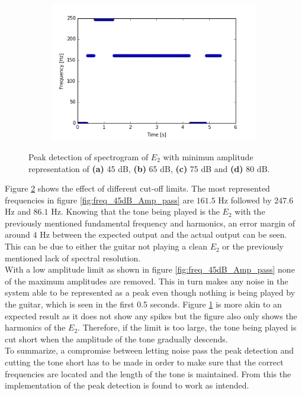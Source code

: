 \begin{figure}[H]
\begin{subfigure}{0.49\textwidth}
\includegraphics[width=\textwidth]{figures/peak_detection/peak_lim4.png}
\caption{}
\label{fig:freq_80dB_Amp_pass}

\end{subfigure}
\caption{Peak detection of spectrogram of $E_2$ with minimun amplitude representation of \textbf{(a)} 45 dB, \textbf{(b)} 65 dB, \textbf{(c)} 75 dB and \textbf{(d)} 80 dB.}
\label{fig:valdation_peak_detection}
\end{figure}
Figure \ref{fig:valdation_peak_detection} shows the effect of different cut-off limits. The most represented frequencies in figure \ref{fig:freq_45dB_Amp_pass} are $161.5$ Hz followed by $247.6$ Hz and $86.1$ Hz. 
Knowing that the tone being played is the $E_2$ with the previously mentioned fundamental frequency and harmonics, an error margin of around $4$ Hz between the expected output and the actual output can be seen. This can be due to either the guitar not playing a clean $E_2$ or the previously mentioned lack of spectral resolution.
\\
With a low amplitude limit as shown in figure \ref{fig:freq_45dB_Amp_pass} none of the maximum amplitudes are removed. This in turn makes any noise in the system able to be represented as a peak even though nothing is being played by the guitar, which is seen in the first 0.5 seconds.
Figure \ref{fig:freq_80dB_Amp_pass} is more akin to an expected result as it does not show any spikes but the figure also only shows the harmonics of the $E_2$. Therefore, if the limit is too large, the tone being played is cut short when the amplitude of the tone gradually descends.
\\
To summarize, a compromise between letting noise pass the peak detection and cutting the tone short has to be made in order to make sure that the correct frequencies are located and the length of the tone is maintained. From this the implementation of the peak detection is found to work as intended.